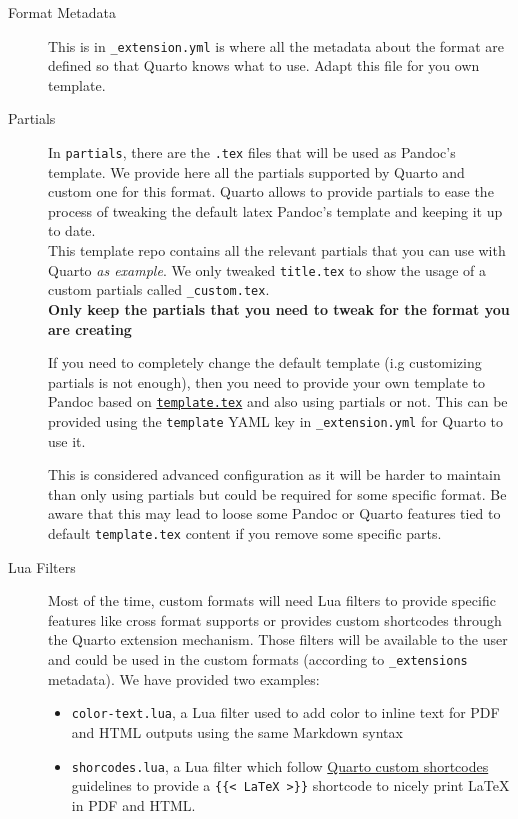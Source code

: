 \documentclass[
]{aft}
\providecommand{\tightlist}{%
  \setlength{\itemsep}{0pt}\setlength{\parskip}{0pt}}\usepackage{longtable,booktabs,array}
\begin{document}
\begin{description}
\item[Format Metadata]
This is in \texttt{\_extension.yml} is where all the metadata about the
format are defined so that Quarto knows what to use. Adapt this file for
you own template.
\item[Partials]
In \texttt{partials}, there are the \texttt{.tex} files that will be
used as Pandoc's template. We provide here all the partials supported by
Quarto and custom one for this format. Quarto allows to provide partials
to ease the process of tweaking the default latex Pandoc's template and
keeping it up to date.\\
This template repo contains all the relevant partials that you can use
with Quarto \emph{as example}. We only tweaked \texttt{title.tex} to
show the usage of a custom partials called \texttt{\_custom.tex}.\\
\textbf{Only keep the partials that you need to tweak for the format you
are creating}

If you need to completely change the default template (i.g customizing
partials is not enough), then you need to provide your own template to
Pandoc based on
\href{https://github.com/quarto-dev/quarto-cli/blob/main/src/resources/formats/pdf/pandoc/template.tex}{\texttt{template.tex}}
and also using partials or not. This can be provided using the
\texttt{template} YAML key in \texttt{\_extension.yml} for Quarto to use
it.

This is considered advanced configuration as it will be harder to
maintain than only using partials but could be required for some
specific format. Be aware that this may lead to loose some Pandoc or
Quarto features tied to default \texttt{template.tex} content if you
remove some specific parts.
\item[Lua Filters]
Most of the time, custom formats will need Lua filters to provide
specific features like cross format supports or provides custom
shortcodes through the Quarto extension mechanism. Those filters will be
available to the user and could be used in the custom formats (according
to \texttt{\_extensions} metadata). We have provided two examples:

\begin{itemize}
\tightlist
\item
  \texttt{color-text.lua}, a Lua filter used to add color to inline text
  for PDF and HTML outputs using the same Markdown syntax
\item
  \texttt{shorcodes.lua}, a Lua filter which follow
  \href{https://quarto.org/docs/authoring/shortcodes.html\#custom-shortcodes}{Quarto
  custom shortcodes} guidelines to provide a
  \texttt{\{\{\textless{}\ LaTeX\ \textgreater{}\}\}} shortcode to
  nicely print LaTeX in PDF and HTML.
\end{itemize}


\end{description}
\end{document}
